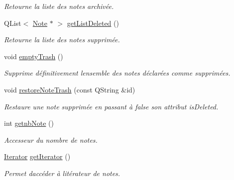 \begin{DoxyCompactItemize}
\begin{DoxyCompactList}\small\item\em Retourne la liste des notes archivée. \end{DoxyCompactList}\item 
\mbox{\label{class_notes_manager_ae6b144ba1bc14b895be36b194a2e768e}} 
Q\+List$<$ \hyperlink{class_note}{Note} $\ast$ $>$ \hyperlink{class_notes_manager_ae6b144ba1bc14b895be36b194a2e768e}{get\+List\+Deleted} ()
\begin{DoxyCompactList}\small\item\em Retourne la liste des notes supprimée. \end{DoxyCompactList}\item 
void \hyperlink{class_notes_manager_a84e962ad7fa999cbb687fb43c1b3bab4}{empty\+Trash} ()
\begin{DoxyCompactList}\small\item\em Supprime définitivement l\textquotesingle{}ensemble des notes déclarées comme supprimées. \end{DoxyCompactList}\item 
void \hyperlink{class_notes_manager_abc6587a5d3986ae674e5dd4b9044f348}{restore\+Note\+Trash} (const Q\+String \&id)
\begin{DoxyCompactList}\small\item\em Restaure une note supprimée en passant à false son attribut is\+Deleted. \end{DoxyCompactList}\item 
\mbox{\label{class_notes_manager_a9cab39a524fd23c6523f895e81f75028}} 
int \hyperlink{class_notes_manager_a9cab39a524fd23c6523f895e81f75028}{getnb\+Note} ()
\begin{DoxyCompactList}\small\item\em Accesseur du nombre de notes. \end{DoxyCompactList}\item 
\mbox{\label{class_notes_manager_a4907351a20cc85b1fe0327ac1b15c7da}} 
\hyperlink{class_notes_manager_1_1_iterator}{Iterator} \hyperlink{class_notes_manager_a4907351a20cc85b1fe0327ac1b15c7da}{get\+Iterator} ()
\begin{DoxyCompactList}\small\item\em Permet d\textquotesingle{}accéder à l\textquotesingle{}itérateur de notes. \end{DoxyCompactList}\end{DoxyCompactItemize}
